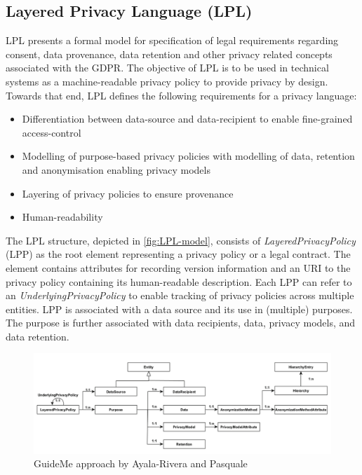 \subsection{Layered Privacy Language (LPL)}
LPL \cite{gerl_lpl_2018} presents a formal model for specification of legal requirements regarding consent, data provenance, data retention and other privacy related concepts associated with the GDPR.
The objective of LPL is to be used in technical systems as a machine-readable privacy policy to provide privacy by design. Towards that end, LPL defines the following requirements for a privacy language:
\begin{itemize}
    \item Differentiation between data-source and data-recipient to enable fine-grained access-control
    \item Modelling of purpose-based privacy policies with modelling of data, retention and anonymisation enabling privacy models
    \item Layering of privacy policies to ensure provenance 
    \item Human-readability
\end{itemize}

The LPL structure, depicted in \autoref{fig:LPL-model}, consists of \textit{LayeredPrivacyPolicy} (LPP) as the root element representing a privacy policy or a legal contract. The element contains attributes for recording version information and an URI to the privacy policy containing its human-readable description. Each LPP can refer to an \textit{UnderlyingPrivacyPolicy} to enable tracking of privacy policies across multiple entities.
LPP is associated with a data source and its use in (multiple) purposes. The purpose is further associated with data recipients, data, privacy models, and data retention.
\begin{figure}[htbp]
    \centering
    \includegraphics[width=\linewidth]{img/LPL_model.png}
    \caption{GuideMe approach by Ayala-Rivera and Pasquale \cite{gerl_lpl_2018}}
    \label{fig:LPL-model}
\end{figure}

